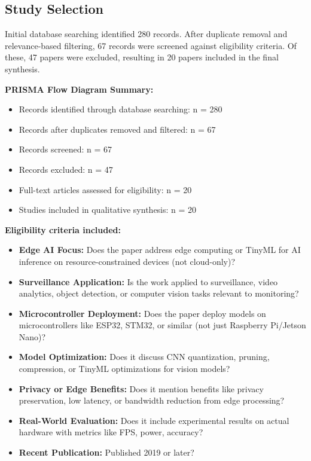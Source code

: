 \documentclass[12pt, a4paper]{article}
\begin{document}
\subsection{Study Selection}
Initial database searching identified 280 records. After duplicate removal and relevance-based filtering, 67 records were screened against eligibility criteria. Of these, 47 papers were excluded, resulting in 20 papers included in the final synthesis.

\textbf{PRISMA Flow Diagram Summary:}
\begin{itemize}
    \item Records identified through database searching: n = 280
    \item Records after duplicates removed and filtered: n = 67
    \item Records screened: n = 67
    \item Records excluded: n = 47
    \item Full-text articles assessed for eligibility: n = 20
    \item Studies included in qualitative synthesis: n = 20
\end{itemize}

\textbf{Eligibility criteria included:}
\begin{itemize}
    \item \textbf{Edge AI Focus:} Does the paper address edge computing or TinyML for AI inference on resource-constrained devices (not cloud-only)?
    \item \textbf{Surveillance Application:} Is the work applied to surveillance, video analytics, object detection, or computer vision tasks relevant to monitoring?
    \item \textbf{Microcontroller Deployment:} Does the paper deploy models on microcontrollers like ESP32, STM32, or similar (not just Raspberry Pi/Jetson Nano)?
    \item \textbf{Model Optimization:} Does it discuss CNN quantization, pruning, compression, or TinyML optimizations for vision models?
    \item \textbf{Privacy or Edge Benefits:} Does it mention benefits like privacy preservation, low latency, or bandwidth reduction from edge processing?
    \item \textbf{Real-World Evaluation:} Does it include experimental results on actual hardware with metrics like FPS, power, accuracy?
    \item \textbf{Recent Publication:} Published 2019 or later?
\end{itemize}
\end{document}
